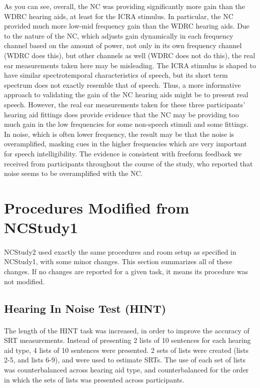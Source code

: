 As you can see, overall, the NC was providing significantly more gain than the WDRC hearing aids, at least for the ICRA stimulus.  In particular, the NC provided much more low-mid frequency gain than the WDRC hearing aids.  Due to the nature of the NC, which adjusts gain dynamically in each frequency channel based on the amount of power, not only in its own frequency channel (WDRC does this), but other channels as well (WDRC does not do this), the real ear measurements taken here may be misleading.  The ICRA stimulus is shaped to have similar spectrotemporal characteristics of speech, but its short term spectrum does not exactly resemble that of speech.  Thus, a more informative approach to validating the gain of the NC hearing aids might be to present real speech.  However, the real ear measurements taken for these three participants' hearing aid fittings does provide evidence that the NC may be providing too much gain in the low frequencies for some non-speech stimuli and some fittings.  In noise, which is often lower frequency, the result may be that the noise is overamplified, masking cues in the higher frequencies which are very important for speech intelligibility.  The evidence is consistent with freeform feedback we received from participants throughout the course of the study, who reported that noise seems to be overamplified with the NC.

\section{Procedures Modified from NCStudy1}
\paragraph{}NCStudy2 used exactly the same procedures and room setup as specified in NCStudy1, with some minor changes.  This section summarizes all of these changes.  If no changes are reported for a given task, it means its procedure was not modified.

\subsection{Hearing In Noise Test (HINT)}
\paragraph{}The length of the HINT task was increased, in order to improve the accuracy of SRT measurements.  Instead of presenting 2 lists of 10 sentences for each hearing aid type, 4 lists of 10 sentences were presented.  2 sets of lists were created (lists 2-5, and lists 6-9), and were used to estimate SRTs.  The use of each set of lists was counterbalanced across hearing aid type, and counterbalanced for the order in which the sets of lists was presented across participants.


